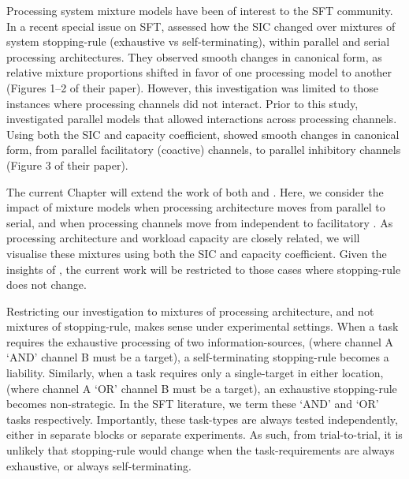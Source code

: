 Processing system mixture models have been of interest to the SFT community. In a recent special issue on SFT,  assessed how the SIC changed over mixtures of system stopping-rule (exhaustive vs self-terminating), within parallel and serial processing architectures. They observed smooth changes in canonical form, as relative mixture proportions shifted in favor of one processing model to another (Figures 1--2 of their paper). However, this investigation was limited to those instances where processing channels did not interact. Prior to this study,  investigated parallel models that allowed interactions across processing channels. Using both the SIC and capacity coefficient,  showed smooth changes in canonical form, from parallel facilitatory (coactive) channels, to parallel inhibitory channels (Figure 3 of their paper). 

The current Chapter will extend the work of both  and . Here, we consider the impact of mixture models when processing architecture moves from parallel to serial, and when processing channels move from independent to facilitatory \cite<à la>{eidels2011}. As processing architecture and workload capacity are closely related, we will visualise these mixtures using both the SIC and capacity coefficient. Given the insights of , the current work will be restricted to those cases where stopping-rule does not change.

Restricting our investigation to mixtures of processing architecture, and not mixtures of stopping-rule, makes sense under experimental settings. When a task requires the exhaustive processing of two information-sources, (\eg where channel A `AND' channel B must be a target), a self-terminating stopping-rule becomes a liability. Similarly, when a task requires only a single-target in either location, (\eg where channel A `OR' channel B must be a target), an exhaustive stopping-rule becomes non-strategic. In the SFT literature, we term these `AND' and `OR' tasks respectively. Importantly, these task-types are always tested independently, either in separate blocks or separate experiments. As such, from trial-to-trial, it is unlikely that stopping-rule would change when the task-requirements are always exhaustive, or always self-terminating. 

